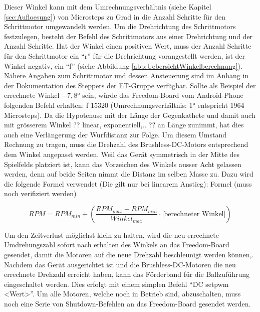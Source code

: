 Dieser Winkel kann mit dem Umrechnungsverhältnis (siehe Kapitel \ref{sec:Aufloesung}) von Microsteps zu Grad 
in die Anzahl Schritte für den Schrittmotor umgewandelt werden. Um die Drehrichtung des Schrittmotors festzulegen, besteht der 
Befehl des Schrittmotors aus einer Drehrichtung und der Anzahl Schritte. Hat der Winkel einen positiven Wert, muss der Anzahl 
Schritte für den Schrittmotor ein  \enquote{r} für die Drehrichtung vorangestellt werden, ist der Winkel negativ, ein  \enquote{f} 
(siehe Abbildung \ref{abb:UebersichtWinkelberechnung}).  
\newline
\newline
Nähere Angaben zum Schrittmotor und dessen Ansteuerung sind im Anhang in der Dokumentation des Steppers der ET-Gruppe verfügbar.
\newline
\newline
Sollte als Beispiel der errechnete Winkel $-7,8\si{\degree}$ sein, würde das Freedom-Board vom Android-Phone folgenden 
Befehl erhalten: f 15320 (Umrechnungsverhältnis: $1\si{\degree}$ entspricht 1964 Microsteps).
\newline
Da die Hypotenuse mit der Länge der Gegenkathete und damit auch mit grösserem Winkel ?? linear, exponentiell,.. ?? an Länge zunimmt, 
hat dies auch eine Verlängerung der Wurfdistanz zur Folge. Um diesem Umstand Rechnung zu tragen, muss die Drehzahl des 
Brushless-DC-Motors entsprechend dem Winkel angepasst werden. Weil das Gerät symmetrisch in der Mitte des Spielfelds platziert ist, 
kann das Vorzeichen des Winkels ausser Acht gelassen werden, denn auf beide Seiten nimmt die Distanz im selben Masse zu.
Dazu wird die folgende Formel verwendet (Die gilt nur bei linearem Anstieg):
\newline
\newline
Formel (muss noch verifiziert werden)
 
\begin{equation}
RPM = RPM_{min} +  \left( \frac{RPM_{max} -RPM_{min}}{Winkel_{max}} \cdot |\text{berechneter Winkel}| \right)
\end{equation}
 
Um den Zeitverlust möglichst klein zu halten, wird die neu errechnete Umdrehungszahl sofort nach erhalten des Winkels an das 
Freedom-Board gesendet, damit die Motoren auf die neue Drehzahl beschleunigt werden können,.
Nachdem das Gerät ausgerichtet ist und die Brushless-DC-Motoren die neu errechnete Drehzahl erreicht haben, kann das Förderband 
für die Ballzuführung eingeschaltet werden. Dies erfolgt mit einem simplen Befehl \enquote{DC setpwm <Wert>}. 
Um alle Motoren, welche noch in Betrieb sind, abzuschalten, muss noch eine Serie von Shutdown-Befehlen an das 
Freedom-Board gesendet werden. 


            
            
